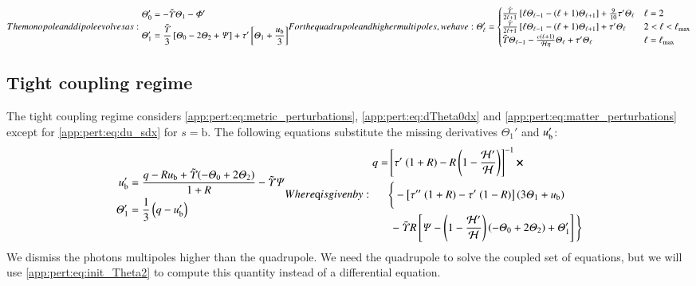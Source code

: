 \begin{subequations}\label{app:pert:eq:photon_multipoles}
The monopole and dipole evolves as:
\begin{align}
    \Theta_0' &= -\ckH \Theta_1 - \Phi ' \label{app:pert:eq:dTheta0dx}\\
    \Theta_1' &= \frac{\ckH}{3} \left[ \Theta_0 - 2\Theta_2 + \Psi \right] + \tau'\left[\Theta_1 + \frac{u\ped{b}}{3} \right] \label{app:pert:eq:dTheta1dx}
\end{align}
For the quadrupole and higher multipoles, we have:
\begin{align}
\Theta_\ell' = \begin{cases}
    \frac{\ckH}{2\ell + 1} \left[ \ell \Theta_{\ell-1}-  (\ell+1) \Theta_{\ell+1} \right] + \frac{9}{10}\tau ' \Theta_\ell & \ell = 2 \\ 
    \frac{\ckH}{2\ell + 1} \left[ \ell \Theta_{\ell-1}-  (\ell+1) \Theta_{\ell+1} \right] + \tau ' \Theta_\ell  & 2< \ell < \ell\ped{max} \\
    \ckH \Theta_{\ell-1} - \frac{c(\ell+1)}{\Hp \eta}\Theta_{\ell} + \tau' \Theta_{\ell}& \ell=\ell\ped{max}
\end{cases} \label{app:pert:eq:dThetaelldx}
\end{align}
\end{subequations}




\subsection{Tight coupling regime}
The tight coupling regime considers \cref{app:pert:eq:metric_perturbations}, \cref{app:pert:eq:dTheta0dx} and \cref{app:pert:eq:matter_perturbations} except for \cref{app:pert:eq:du_sdx} for $s=\mathrm{b}$. The following equations substitute the missing derivatives $\Theta_1'$ and $u_\mathrm{b}'$:
\begin{subequations}\label{app:pert:eq:tight_coupling}
\begin{align}
    u\ped{b}' &= \frac{q-Ru\ped{b} + \ckH(-\Theta_0+2\Theta_2)}{1+R} - \ckH\Psi \\
    \Theta_1' &= \frac{1}{3}\left(q-u\ped{b}'\right)
\end{align}
Where $q$ is given by:
\begin{align}
    q = &\left[\tau'~(1+R) - R\left(1-\frac{\Hp'}{\Hp}\right)\right]^{-1} \cross \\
    &\Bigg\{ -\left[\tau''~(1+R) - \tau'~(1-R) \right] \left(3\Theta_1 + u\ped{b}\right) \\
    &\,  - \ckH R\left[  \Psi - \left(1-\frac{\Hp'}{\Hp}\right)\left(-\Theta_0+ 2\Theta_2\right)+ \Theta_1'\right]
    \Bigg\}
\end{align}
\end{subequations}
We dismiss the photons multipoles higher than the quadrupole. We need the quadrupole to solve the coupled set of equations, but we will use \cref{app:pert:eq:init_Theta2} to compute this quantity instead of a differential equation.


